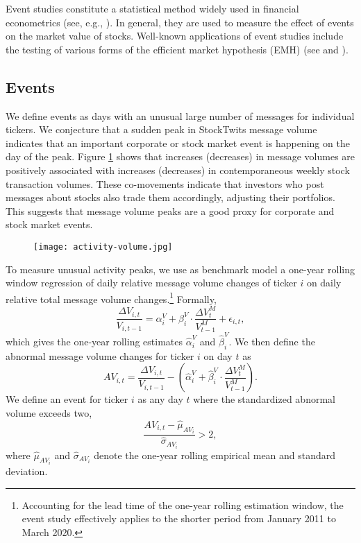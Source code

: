 Event studies constitute a statistical method widely used in financial econometrics (see, e.g., \citet{mackinlay1997event}). In general, they are used to measure the effect of events on the market value of stocks. Well-known applications of event studies include the testing of various forms of the efficient market hypothesis (EMH) (see \citet{fama1969} and \citet{fama1991efficient}). 


\subsection{Events}
We define events as days with an unusual large number of messages for individual tickers. We conjecture that a sudden peak in StockTwits message volume indicates that an important corporate or stock market event is happening on the day of the peak. Figure \ref{fig:actvol} shows that increases (decreases) in message volumes are positively associated with increases (decreases) in contemporaneous weekly stock transaction volumes. These co-movements indicate that investors who post messages about stocks also trade them accordingly, adjusting their portfolios. This suggests that message volume peaks are a good proxy for corporate and stock market events.


\begin{figure}[h]
    \centering
    \texttt{[image: activity-volume.jpg]}
    \label{fig:actvol}
\end{figure}

\clearpage

To measure unusual activity peaks, we use as benchmark model a one-year rolling window regression of daily relative message volume changes of ticker $i$ on daily relative total message volume changes.\footnote{Accounting for the lead time of the one-year rolling estimation window, the event study effectively applies to the shorter period from January 2011 to March 2020.} Formally,
\begin{equation}
\dfrac{\Delta V_{i,t}}{V_{i,t-1}} = \alpha_i^V + \beta_i^V \cdot \dfrac{\Delta V_t^M}{V_{t-1}^M} + \epsilon_{i,t},    
\end{equation} 
which gives the one-year rolling estimates $\hat{\alpha}_i^V$ and $\hat{\beta}_i^V$. We then define the abnormal message volume changes for ticker $i$ on day $t$ as 
\begin{equation}
    AV_{i,t} = \dfrac{\Delta V_{i,t}}{V_{i,t-1}} - \left(\hat{\alpha}_i^V + \hat{\beta}_i^V \cdot \dfrac{\Delta V_t^M}{V_{t-1}^M}\right).
\end{equation}
We define an event for ticker $i$ as any day $t$ where the standardized abnormal volume exceeds two, 
\begin{equation}
    \dfrac{AV_{i,t} - \hat{\mu}_{AV_i}}{\hat{\sigma}_{AV_i}} > 2,
\end{equation}
where $\hat{\mu}_{AV_i}$ and $\hat{\sigma}_{AV_i}$ denote the one-year rolling empirical mean and standard deviation. 



